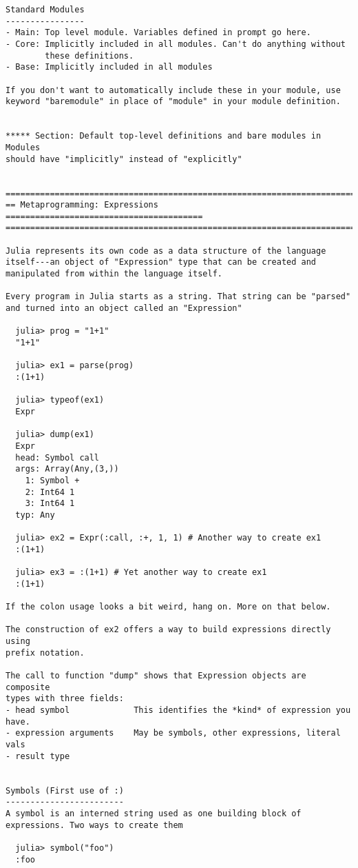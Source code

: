 \documentclass[12pt]{article}
\theoremstyle{plain}
\theoremstyle{definition}
\theoremstyle{remark}
\begin{document}
\begin{lstlisting}
Standard Modules
----------------
- Main: Top level module. Variables defined in prompt go here.
- Core: Implicitly included in all modules. Can't do anything without
        these definitions.
- Base: Implicitly included in all modules

If you don't want to automatically include these in your module, use
keyword "baremodule" in place of "module" in your module definition.


***** Section: Default top-level definitions and bare modules in Modules
should have "implicitly" instead of "explicitly"


========================================================================
== Metaprogramming: Expressions ========================================
========================================================================

Julia represents its own code as a data structure of the language
itself---an object of "Expression" type that can be created and
manipulated from within the language itself.

Every program in Julia starts as a string. That string can be "parsed"
and turned into an object called an "Expression"

  julia> prog = "1+1"
  "1+1"

  julia> ex1 = parse(prog)
  :(1+1)

  julia> typeof(ex1)
  Expr

  julia> dump(ex1)
  Expr
  head: Symbol call
  args: Array(Any,(3,))
    1: Symbol +
    2: Int64 1
    3: Int64 1
  typ: Any

  julia> ex2 = Expr(:call, :+, 1, 1) # Another way to create ex1
  :(1+1)

  julia> ex3 = :(1+1) # Yet another way to create ex1
  :(1+1)

If the colon usage looks a bit weird, hang on. More on that below.

The construction of ex2 offers a way to build expressions directly using
prefix notation.

The call to function "dump" shows that Expression objects are composite
types with three fields:
- head symbol             This identifies the *kind* of expression you have.
- expression arguments    May be symbols, other expressions, literal vals
- result type


Symbols (First use of :)
------------------------
A symbol is an interned string used as one building block of
expressions. Two ways to create them

  julia> symbol("foo")
  :foo


\end{lstlisting}
\end{document}
